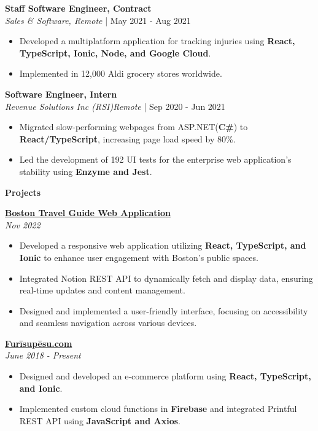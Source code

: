 \documentclass[10pt]{article}
\begin{document}
\textbf{Staff Software Engineer, Contract}\\
\textit{Sales \& Software, Remote} | May 2021 - Aug 2021

\begin{itemize}[noitemsep]
    \item Developed a multiplatform application for tracking injuries using \textbf{React, TypeScript, Ionic, Node, and Google Cloud}.
    \item Implemented in 12,000 Aldi grocery stores worldwide.
\end{itemize}

\textbf{Software Engineer, Intern}\\
\textit{Revenue Solutions Inc (RSI)Remote} | Sep 2020 - Jun 2021

\begin{itemize}[noitemsep]
    \item Migrated slow-performing webpages from ASP.NET(\textbf{C\#}) to \textbf{React/TypeScript}, increasing page load speed by 80\%.
    \item Led the development of 192 UI tests for the enterprise web application's stability using \textbf{Enzyme and Jest}.
\end{itemize}

\begin{center}
    \textbf{Projects}
    \hrulefill
\end{center}

\textbf{\href{https://bostonain-tboring.web.app/home}{Boston Travel Guide Web Application}}\\
\textit{Nov 2022}
\begin{itemize}[noitemsep]
    \item Developed a responsive web application utilizing \textbf{React, TypeScript, and Ionic} to enhance user engagement with Boston's public spaces.
    \item Integrated Notion REST API to dynamically fetch and display data, ensuring real-time updates and content management.
    \item Designed and implemented a user-friendly interface, focusing on accessibility and seamless navigation across various devices.
\end{itemize}

\textbf{\href{https://furisupesu.com/}{Furīsupēsu.com}}\\
\textit{June 2018 - Present}
\begin{itemize}[noitemsep]
    \item Designed and developed an e-commerce platform using \textbf{React, TypeScript, and Ionic}.
    \item Implemented custom cloud functions in \textbf{Firebase} and integrated Printful REST API using \textbf{JavaScript and Axios}.
\end{itemize}
\end{document}
